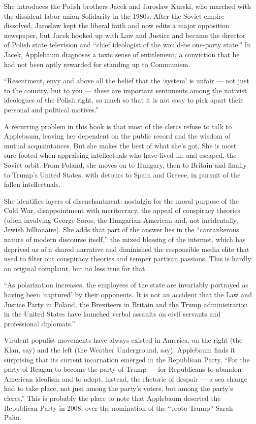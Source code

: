 She introduces the Polish brothers Jacek and Jaroslaw Kurski, who
marched with the dissident labor union Solidarity in the 1980s. After
the Soviet empire dissolved, Jaroslaw kept the liberal faith and now
edits a major opposition newspaper, but Jacek hooked up with Law and
Justice and became the director of Polish state television and ``chief
ideologist of the would-be one-party state.'' In Jacek, Applebaum
diagnoses a toxic sense of entitlement, a conviction that he had not
been aptly rewarded for standing up to Communism.

``Resentment, envy and above all the belief that the `system' is unfair
--- not just to the country, but to you --- these are important
sentiments among the nativist ideologues of the Polish right, so much so
that it is not easy to pick apart their personal and political
motives.''

A recurring problem in this book is that most of the clercs refuse to
talk to Applebaum, leaving her dependent on the public record and the
wisdom of mutual acquaintances. But she makes the best of what she's
got. She is most sure-footed when appraising intellectuals who have
lived in, and escaped, the Soviet orbit. From Poland, she moves on to
Hungary, then to Britain and finally to Trump's United States, with
detours to Spain and Greece, in pursuit of the fallen intellectuals.

She identifies layers of disenchantment: nostalgia for the moral purpose
of the Cold War, disappointment with meritocracy, the appeal of
conspiracy theories (often involving George Soros, the
Hungarian-American and, not incidentally, Jewish billionaire). She adds
that part of the answer lies in the ``cantankerous nature of modern
discourse itself,'' the mixed blessing of the internet, which has
deprived us of a shared narrative and diminished the responsible media
elite that used to filter out conspiracy theories and temper partisan
passions. This is hardly an original complaint, but no less true for
that.

``As polarization increases, the employees of the state are invariably
portrayed as having been `captured' by their opponents. It is not an
accident that the Law and Justice Party in Poland, the Brexiteers in
Britain and the Trump administration in the United States have launched
verbal assaults on civil servants and professional diplomats.''

Virulent populist movements have always existed in America, on the right
(the Klan, say) and the left (the Weather Underground, say). Applebaum
finds it surprising that its current incarnation emerged in the
Republican Party. ``For the party of Reagan to become the party of Trump
--- for Republicans to abandon American idealism and to adopt, instead,
the rhetoric of despair --- a sea change had to take place, not just
among the party's voters, but among the party's clercs.'' This is
probably the place to note that Applebaum deserted the Republican Party
in 2008, over the nomination of the ``proto-Trump'' Sarah Palin.

